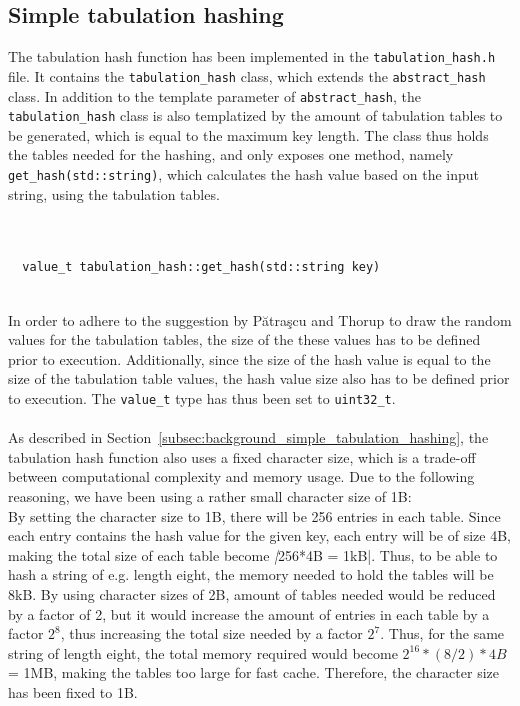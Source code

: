 \documentclass[11pt]{report} %
\begin{document}
\subsection{Simple tabulation hashing}
\label{subsec:implementation_tabulation_hash}
The tabulation hash function has been implemented in the \verb=tabulation_hash.h= file. It contains the \verb|tabulation_hash| class, which extends the \verb|abstract_hash| class. In addition to the template parameter of \verb|abstract_hash|, the \verb|tabulation_hash| class is also templatized by the amount of tabulation tables to be generated, which is equal to the maximum key length. The class thus holds the tables needed for the hashing, and only exposes one method, namely \verb|get_hash(std::string)|, which calculates the hash value based on the input string, using the tabulation tables. \\
\\
\begin{fminipage}{\textwidth}
\begin{lstlisting}[]  % Start your code-block

  value_t tabulation_hash::get_hash(std::string key)
\end{lstlisting}
\end{fminipage}
\vphantom{fill}\\
In order to adhere to the suggestion by Pătraşcu and Thorup to draw the random values for the tabulation tables, the size of the these values has to be defined prior to execution. Additionally, since the size of the hash value is equal to the size of the tabulation table values, the hash value size also has to be defined prior to execution. The \verb|value_t| type has thus been set to \verb|uint32_t|. \\
\\
As described in Section~\ref{subsec:background_simple_tabulation_hashing}, the tabulation hash function also uses a fixed character size, which is a trade-off between computational complexity and memory usage. Due to the following reasoning, we have been using a rather small character size of 1B: \\
By setting the character size to 1B, there will be 256 entries in each table. Since each entry contains the hash value for the given key, each entry will be of size 4B, making the total size of each table become \emph|256*4B = 1kB|. Thus, to be able to hash a string of e.g. length eight, the memory needed to hold the tables will be 8kB. By using character sizes of 2B, amount of tables needed would be reduced by a factor of 2, but it would increase the amount of entries in each table by a factor $2^{8}$, thus increasing the total size needed by a factor $2^7$. Thus, for the same string of length eight, the total memory required would become $2^{16}*(8/2)*4B$ = 1MB, making the tables too large for fast cache. Therefore, the character size has been fixed to 1B.\\
\end{document}
